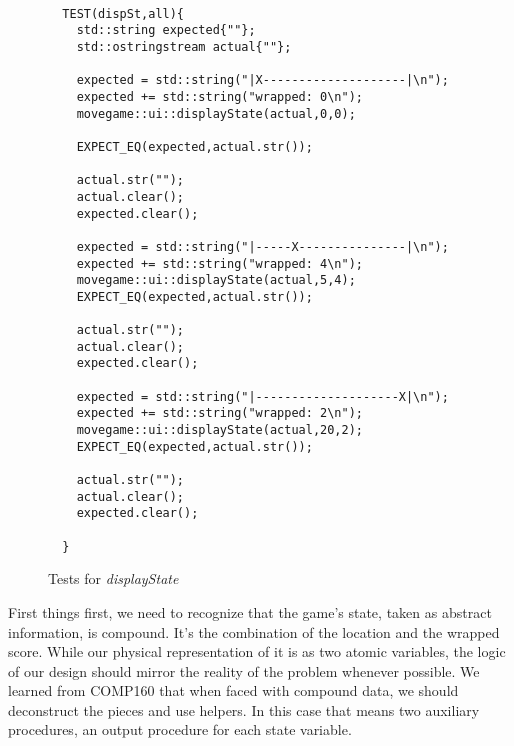 \documentclass[nobib]{tufte-handout}
\begin{document}
\begin{figure}[!htbp]
\begin{lstlisting}

  TEST(dispSt,all){
    std::string expected{""};
    std::ostringstream actual{""};

    expected = std::string("|X--------------------|\n");
    expected += std::string("wrapped: 0\n");
    movegame::ui::displayState(actual,0,0);

    EXPECT_EQ(expected,actual.str());

    actual.str("");
    actual.clear();
    expected.clear();

    expected = std::string("|-----X---------------|\n");
    expected += std::string("wrapped: 4\n");
    movegame::ui::displayState(actual,5,4);
    EXPECT_EQ(expected,actual.str());

    actual.str("");
    actual.clear();
    expected.clear();

    expected = std::string("|--------------------X|\n");
    expected += std::string("wrapped: 2\n");
    movegame::ui::displayState(actual,20,2);
    EXPECT_EQ(expected,actual.str());

    actual.str("");
    actual.clear();
    expected.clear();

  }

\end{lstlisting}
\caption{Tests for \textit{displayState}}
\label{fig:display-tests}
\end{figure}

First things first, we need to recognize that the game's state, taken as abstract information, is compound. It's the combination of the location and the wrapped score. While our physical representation of it is as two atomic variables, the logic of our design should mirror the reality of the problem whenever possible. We learned from COMP160 that when faced with compound data, we should deconstruct the pieces and use helpers. In this case that means two auxiliary procedures, an output procedure for each state variable.
\end{document}
